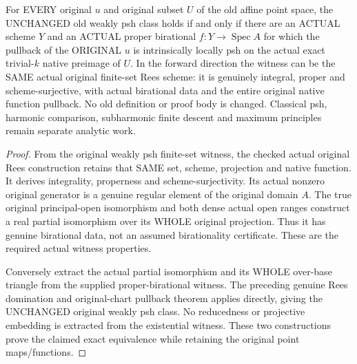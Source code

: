 \begin{theorem}
\label{paper:actual-proper-birational-weakly-psh-witness-iff}
\leanok
{}
For EVERY original $u$ and original subset $U$ of the old affine point space, the UNCHANGED
old weakly psh class holds if and only if there are an ACTUAL scheme $Y$ and
an ACTUAL proper birational $f:Y\to\operatorname{Spec}A$ for which the pullback
of the ORIGINAL $u$ is intrinsically locally psh on the actual exact trivial-$k$
native preimage of $U$.
In the forward direction the witness can be the SAME actual original finite-set
Rees scheme: it is genuinely integral, proper and scheme-surjective, with
actual birational data and the entire original native function pullback.
No old definition or proof body is changed. Classical psh, harmonic comparison,
subharmonic finite descent and maximum principles remain separate analytic work.
\end{theorem}
\begin{proof}
From the original weakly psh finite-set witness, the checked actual original
Rees construction retains that SAME set, scheme, projection and native function.
It derives integrality, properness and scheme-surjectivity. Its actual nonzero
original generator is a genuine regular element of the original domain $A$.
The true original principal-open isomorphism and both dense actual open ranges
construct a real partial isomorphism over its WHOLE original projection. Thus
it has genuine birational data, not an assumed birationality certificate.
These are the required actual witness properties.

Conversely extract the actual partial isomorphism and its WHOLE over-base
triangle from the supplied proper-birational witness. The preceding genuine
Rees domination and original-chart pullback theorem applies directly, giving
the UNCHANGED original weakly psh class. No reducedness or projective embedding
is extracted from the existential witness. These two constructions prove the
claimed exact equivalence while retaining the original point maps/functions.
\end{proof}
